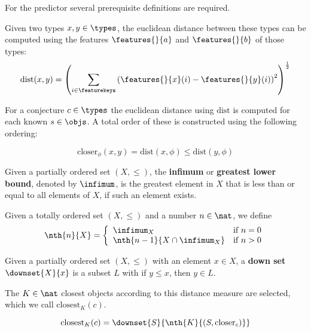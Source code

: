 
For the \knn predictor several prerequisite definitions are required.

\begin{definition}\label{def:dist}
  Given two types $x, y \in \types$, the euclidean distance between these types can be computed using the features $\features{}{a}$ and $\features{}{b}$ of those types:
  $$ \text{dist}(x, y) = \left( \sum_{i \in \featurekeys} \left( \features{}{x}(i) - \features{}{y}(i) \right)^2 \right)^{\frac{1}{2}} $$
\end{definition}

For a conjecture $c \in \types$ the euclidean distance using $\text{dist}$ is computed for each known \coqobj $s \in \objs$.
A total order of these \coqobjs is constructed using the following ordering:

\begin{definition}
  $$
    \text{closer}_\phi(x, y) = \text{dist}(x, \phi) \leq \text{dist}(y, \phi)
  $$
\end{definition}

\begin{definition}\label{def:infimum}
  Given a partially ordered set $(X, \leq)$,
  the \textbf{infimum} or \textbf{greatest lower bound}, denoted by $\infimum$, is the greatest element in $X$ that is less than or equal to all elements of $X$,
  if such an element exists.
\end{definition}

\begin{definition}\label{def:nth}
  Given a totally ordered set $(X, \leq)$ and a number $n \in \nat$, we define
  $$
    \nth{n}{X} = \left\{
      \begin{array}{ll}
        \infimum_X & \text{if}~n = 0 \\
        \nth{n-1}{X \cap \infimum_X} & \text{if}~n > 0 \\
      \end{array}
    \right.
  $$
\end{definition}

\begin{definition}\label{def:downset}
  Given a partially ordered set $(X, \leq)$ with an element $x \in X$, a \textbf{down set} $\downset{X}{x}$ is a subset $L$ with if $y \leq x$, then $y \in L$.
\end{definition}

The $K \in \nat$ closest objects according to this distance measure are selected, which we call $\text{closest}_K(c)$.
\begin{definition}
  $$
    \text{closest}_K(c) = \downset{S}{\nth{K}{(S, \text{closer}_c)}}
  $$
\end{definition}

